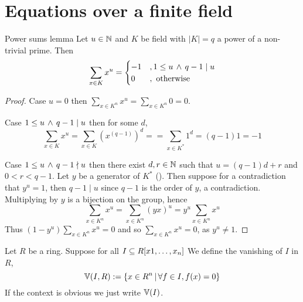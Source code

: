 \section{Equations over a finite field}
\begin{prop}{Power sums lemma}
    Let $u \in \mathbb{N}$ and $K$ be field with $|K| = q$ 
    a power of a non-trivial prime.
    Then 
    \[
        \sum_{x \in K} x^u = 
        \begin{cases}
            -1 &, 1 \le u \, \land \, q - 1 \mid u\\
            0 &, \text{ otherwise}
        \end{cases}
    \]
\end{prop}
\begin{proof}
    Case $u = 0$ then 
    $\sum_{x \in K^n} x^u = \sum_{x \in K^n} 0 = 0$.

    Case $1 \le u \, \land \, q - 1 \mid u$ then for some $d$,
    \[\sum_{x \in K} x^u = \sum_{x \in K} (x^(q-1))^d = 
     = \sum_{x \in K^*} 1^d = (q - 1) 1 = -1\]

    Case $1 \le u \, \land \, q - 1 \nmid u$ then there exist 
    $d, r \in \mathbb{N}$ such that $u = (q-1)d + r$ and $0 < r < q - 1$.
    Let $y$ be a generator of $K^*$ 
    ().
    Then suppose for a contradiction that $y^u = 1$,
    then $q - 1 \mid u$ since $q - 1$ is the order of $y$, 
    a contradiction.
    Multiplying by $y$ is a bijection on the group, 
    hence
    \[
        \sum_{x \in K^n} x^u = \sum_{x \in K^n} (yx)^u = 
        y^u \sum_{x \in K^n} x^u
    \]
    Thus $(1 - y^u) \sum_{x \in K^n} x^u = 0$ and so 
    $\sum_{x \in K^n} x^u = 0$, 
    as $y^u \ne 1$.
\end{proof}

\begin{dfn}[Vanishing]
    Let $R$ be a ring.
    Suppose for all $I \subseteq R[x1, \dots , x_n]$
    We define the vanishing of $I$ in $R$, 
    \[\mathbb{V}(I,R) := \{x \in R^n \,|\, \forall f \in I, f(x) = 0\}\]
    If the context is obvious we just write $\mathbb{V}(I)$.
\end{dfn}

